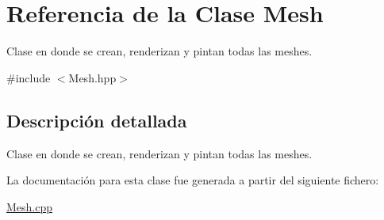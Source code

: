 \hypertarget{class_mesh}{}\section{Referencia de la Clase Mesh}
\label{class_mesh}


Clase en donde se crean, renderizan y pintan todas las meshes.  




{\ttfamily \#include $<$Mesh.\+hpp$>$}



\subsection{Descripción detallada}
Clase en donde se crean, renderizan y pintan todas las meshes. 

La documentación para esta clase fue generada a partir del siguiente fichero\+:\begin{DoxyCompactItemize}
\item 
\mbox{\hyperlink{_mesh_8cpp}{Mesh.\+cpp}}\end{DoxyCompactItemize}
